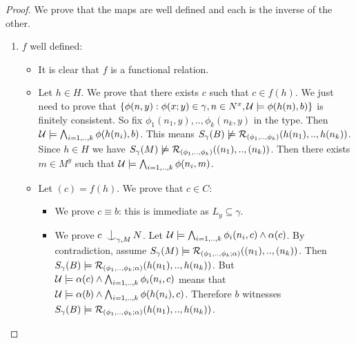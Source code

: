 \documentclass[../main.tex]{subfiles}
\begin{document}
\begin{proof}

	We prove that the maps are well defined and each is the inverse of the other.
	\begin{enumerate}
		\item	$f$ well defined:
			\begin{itemize}
				\item	It is clear that $f$ is a functional relation.
				\item	Let $h \in H$. We prove that there exists $c$ such that $c \in f(h)$. We just need to prove that 
					$\{\phi(n,y) : \phi(x;y) \in \gamma, n \in N^x, \mathcal{U} \models \phi(h(n),b)\}$ is finitely consistent. 
					So fix $\phi_1(n_1,y),..,\phi_k(n_k,y)$ in the type. Then $\mathcal{U} \models \bigwedge_{i=1,..,k} \phi(h(n_i),b)$. 
					This means $S_{\gamma}(B) \not \models \mathcal{R}_{(\phi_1,..,\phi_k)}(h(n_1),..,h(n_k))$.
					Since $h \in H$ we have $S_{\gamma}(M) \not \models \mathcal{R}_{(\phi_1,..,\phi_k)}((n_1),..,(n_k))$.
					Then there exists $m \in M^y$ such that $\mathcal{U} \models \bigwedge_{i=1,..,k} \phi(n_i,m)$.

				\item	Let $(c) = f(h)$. We prove that $c \in C$:
					\begin{itemize}
						\item	We prove $c \equiv b$: this is immediate as $L_y \subseteq \gamma$.
						\item	We prove $c \nonfork_{\gamma,M} N$. Let $\mathcal{U} \models \bigwedge_{i = 1,..,k} \phi_i(n_i,c) \land \alpha(c)$.
							By contradiction, assume $S_{\gamma}(M) \models \mathcal{R}_{(\phi_1,..,\phi_k ; \alpha)}((n_1),..,(n_k))$.
							Then $S_{\gamma}(B) \models \mathcal{R}_{(\phi_1,..,\phi_k; \alpha)}(h(n_1),..,h(n_k))$.
							But $\mathcal{U} \models \alpha(c) \land \bigwedge_{i = 1,..,k} \phi_i(n_i,c)$ means that
							$\mathcal{U} \models \alpha(b) \land \bigwedge_{i=1,..,k} \phi(h(n_i),c)$.
							Therefore $b$ witnesses $S_{\gamma}(B) \models \mathcal{R}_{(\phi_1,..,\phi_k ; \alpha)}(h(n_1),..,h(n_k))$.


\end{itemize}
\end{itemize}
\end{enumerate}
\end{proof}
\end{document}
